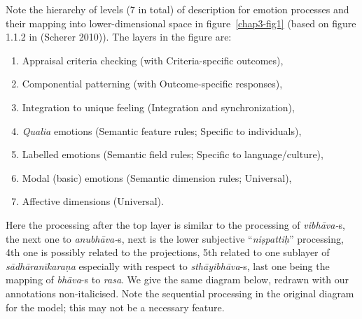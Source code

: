 Note the hierarchy of levels (7 in total) of description for emotion processes and their mapping into lower-dimensional space in figure~\ref{chap3-fig1} (based on figure 1.1.2 in (Scherer 2010)). The layers in the figure are: 
\begin{enumerate}
\item Appraisal criteria checking (with Criteria-specific outcomes), 

\item Componential patterning (with Outcome-specific responses), 

\item Integration to unique feeling (Integration and synchronization), 

\item \textsl{Qualia} emotions (Semantic feature rules; Specific to individuals), 

\item Labelled emotions (Semantic field rules; Specific to language/\break culture), 

\item Modal (basic) emotions (Semantic dimension rules; Universal), 

\item Affective dimensions (Universal). 
\end{enumerate}
Here the processing after the top layer is similar to the processing of \textsl{vibhāva-}s, the next one to \textsl{anubhāva-}s, next is the lower subjective “\textsl{niṣpattiḥ}” processing, 4th one is possibly related to the projections, 5th related to one sublayer of \textsl{sādhāranīkaraṇa} especially with respect to \textsl{sthāyibhāva}-s, last one being the mapping of \textsl{bhāva}-s to \textsl{rasa}. We give the same diagram below, redrawn with our annotations non-italicised. Note the sequential processing in the original diagram for the model; this may not be a necessary feature. 
